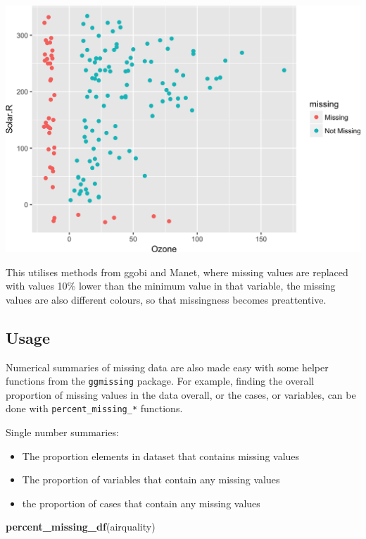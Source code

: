 \documentclass[]{article}
\newenvironment{Shaded}{\begin{snugshade}}{\end{snugshade}}
\newcommand{\KeywordTok}[1]{\textcolor[rgb]{0.13,0.29,0.53}{\textbf{{#1}}}}
\newcommand{\NormalTok}[1]{{#1}}
\providecommand{\tightlist}{%
  \setlength{\itemsep}{0pt}\setlength{\parskip}{0pt}}
\begin{document}
\includegraphics{jsm2017_files/figure-latex/unnamed-chunk-3-1.png}

This utilises methods from ggobi and Manet, where missing values are
replaced with values 10\% lower than the minimum value in that variable,
the missing values are also different colours, so that missingness
becomes preattentive.

\subsection{Usage}\label{usage}

Numerical summaries of missing data are also made easy with some helper
functions from the \texttt{ggmissing} package. For example, finding the
overall proportion of missing values in the data overall, or the cases,
or variables, can be done with \texttt{percent\_missing\_*} functions.

Single number summaries:

\begin{itemize}
\tightlist
\item
  The proportion elements in dataset that contains missing values
\item
  The proportion of variables that contain any missing values
\item
  the proportion of cases that contain any missing values
\end{itemize}

\begin{Shaded}
\begin{Highlighting}[]
\KeywordTok{percent_missing_df}\NormalTok{(airquality)}
\end{Highlighting}
\end{Shaded}
\end{document}
